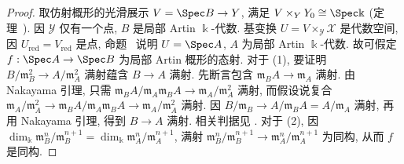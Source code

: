 \begin{proof}
取仿射概形的光滑展示 $V=\Spec B\to\mathcal Y$, 满足 $V\times_{\mathcal Y}\mathcal Y_0\cong\Spec\Bbbk$ (定理~). 因 $\mathcal Y$ 仅有一个点, $B$ 是局部 Artin $\Bbbk$-代数. 基变换 $U=V\times_{\mathcal Y}\mathcal X$ 是代数空间, 因 $U_{\mathrm{red}}=V_{\mathrm{red}}$ 是点, 命题~ 说明 $U=\Spec A$, $A$ 为局部 Artin $\Bbbk$-代数. 故可假定 $f:\Spec A\to\Spec B$ 为局部 Artin 概形的态射. 对于 (1), 要证明 $B/\mathfrak m_B^2\to A/\mathfrak m_A^2$ 满射蕴含 $B\to A$ 满射. 先断言包含 $\mathfrak m_BA\to\mathfrak m_A$ 满射. 由 Nakayama 引理, 只需 $\mathfrak m_BA/\mathfrak m_A\mathfrak m_BA\to\mathfrak m_A/\mathfrak m_A^2$ 满射, 而假设说复合 $\mathfrak m_A/\mathfrak m_A^2\to\mathfrak m_BA/\mathfrak m_A\mathfrak m_BA\to\mathfrak m_A/\mathfrak m_A^2$ 满射. 因 $B/\mathfrak m_B\to A/\mathfrak m_BA=A/\mathfrak m_A$ 满射, 再用 Nakayama 引理, 得到 $B\to A$ 满射. 相关判据见 \cite[引理 II.7.4]{Har77}. 对于 (2), 因 $\dim_{\Bbbk}\mathfrak m_B^n/\mathfrak m_B^{n+1}=\dim_{\Bbbk}\mathfrak m_A^n/\mathfrak m_A^{n+1}$, 满射 $\mathfrak m_B^n/\mathfrak m_B^{n+1}\to\mathfrak m_A^n/\mathfrak m_A^{n+1}$ 为同构, 从而 $f$ 是同构.
\end{proof}

